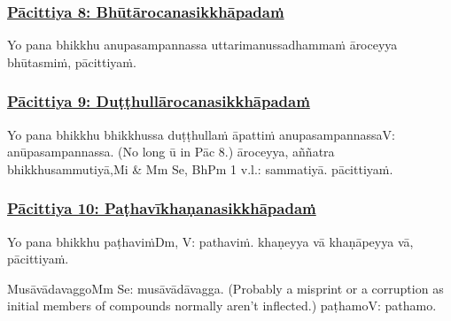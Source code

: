 \subsubsection*{\hyperref[exp8]{Pācittiya 8: Bhūtārocanasikkhāpadaṁ}}
\label{pac8}

Yo pana bhikkhu anupasampannassa uttarimanussadhammaṁ āroceyya bhūtasmiṁ, pācittiyaṁ.



\subsubsection*{\hyperref[exp9]{Pācittiya 9: Duṭṭhullārocanasikkhāpadaṁ}}
\label{pac9}

Yo pana bhikkhu bhikkhussa duṭṭhullaṁ āpattiṁ anupasampannassa\makeatletter\hyperlink{endnote-appendix}\makeatother V: anūpasampannassa. (No long ū in Pāc 8.) āroceyya, aññatra bhikkhusammutiyā,\makeatletter\hyperlink{endnote-appendix}\makeatother Mi & Mm Se, BhPm 1 v.l.: sammatiyā. pācittiyaṁ.



\subsubsection*{\hyperref[exp10]{Pācittiya 10: Paṭhavīkhaṇanasikkhāpadaṁ}}
\label{pac10}

Yo pana bhikkhu paṭhaviṁ\makeatletter\hyperlink{endnote-appendix}\makeatother Dm, V: pathaviṁ. khaṇeyya vā khaṇāpeyya vā, pācittiyaṁ.

\begin{center}
	Musāvādavaggo\makeatletter\hyperlink{endnote-appendix}\makeatother Mm Se: musāvādāvagga. (Probably a misprint or a corruption as initial members of compounds normally aren't inflected.) paṭhamo\makeatletter\hyperlink{endnote-appendix}\makeatother V: pathamo.
\end{center}



